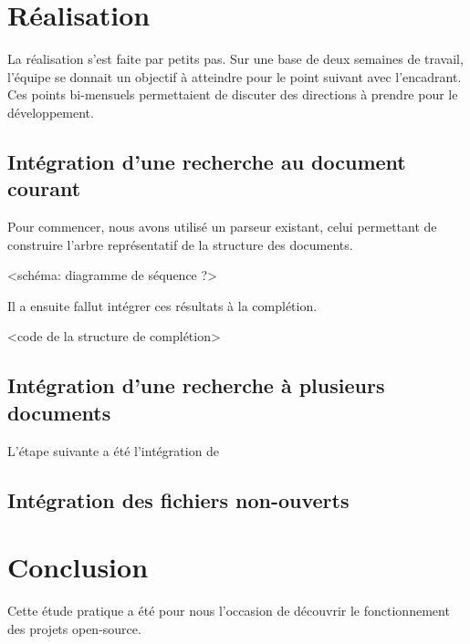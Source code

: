 \documentclass[a4paper,11pt]{report}
\begin{document}
\chapter{Réalisation}
La réalisation s'est faite par petits pas. Sur une base de deux semaines de travail, l'équipe se donnait un objectif à atteindre pour le point suivant avec l'encadrant.
Ces points bi-mensuels permettaient de discuter des directions à prendre pour le développement.

\section{Intégration d'une recherche au document courant}
Pour commencer, nous avons utilisé un parseur existant, celui permettant de construire l'arbre représentatif de la structure des documents.

<schéma: diagramme de séquence ?>

Il a ensuite fallut intégrer ces résultats à la complétion.

<code de la structure de complétion> 

\section{Intégration d'une recherche à plusieurs documents}

L'étape suivante a été l'intégration de 

\section{Intégration des fichiers non-ouverts}

\chapter{Conclusion}
Cette étude pratique a été pour nous l'occasion de découvrir le fonctionnement des projets open-source.
\end{document}
